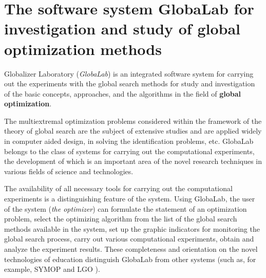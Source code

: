 

\section{The software system GlobaLab for investigation and study of global optimization methods}

Globalizer Laboratory (\textit{GlobaLab}) is an integrated software system for carrying out the experiments with the global search methods for study and investigation of the basic concepts, approaches, and the algorithms in the field of \textbf{global optimization}.

The multiextremal optimization problems considered within the framework of the theory of global search are the subject of extensive studies and are applied widely in computer aided design, in solving the identification problems, etc. GlobaLab belongs to the class of systems for carrying out the computational experiments, the development of which is an important area of the novel research techniques in various fields of science and technologies.

The availability of all necessary tools for carrying out the computational experiments is a distinguishing feature of the system. Using GlobaLab, the user of the system (\textit{the optimizer}) can formulate the statement of an optimization problem, select the optimizing algorithm from the list of the global search methods available in the system, set up the graphic indicators for monitoring the global search process, carry out various computational experiments, obtain and analyze the experiment results. These completeness and orientation on the novel technologies of education distinguish GlobaLab from other systems (such as, for example, SYMOP \cite{7_Gergel1993} and LGO \cite{7_Pinter1996}).

